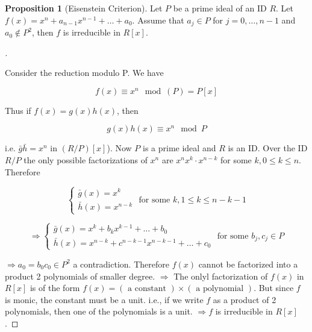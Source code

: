 \documentclass{article}
\theoremstyle{definition}
\newtheorem{prop}{Proposition}
\newenvironment{proofs}[1][\proofname]{%
  \begin{proof}[#1]$ $\par\nobreak\ignorespaces
}{%
  \end{proof}
}
\begin{document}
\begin{prop}[Eisenstein Criterion]
  Let $P$ be a prime ideal of an ID $R$. Let $f(x) = x^n + a_{n - 1}x^{n - 1} + \hdots + a_0$. Assume that $a_j \in P$ for $j = 0, \hdots, n - 1$ and $a_0 \notin P^2$, then $f$ is irreducible in $R[x]$.  
\end{prop}

\begin{proofs}
  Consider the reduction modulo P. We have

  $$f(x) \equiv x^n \mod (P)=P[x]$$

  Thus if $f(x) = g(x) h(x)$, then 

  $$g(x) h(x) \equiv x^n \mod P$$

  i.e. $\bar{g} \bar{h} = x^n$ in $(R/P)[x]$). Now $P$ is a prime ideal and $R$ is an ID. Over the ID $R/P$ the only possible factorizations of $x^n$ are $x^n  x^k \cdot x^{n - k}$ for some $k, 0 \leq k \leq n$. Therefore 

  $$
  \left\{
  \begin{array}{c}
    \bar{g}(x) = x^k \\
    \bar{h}(x) = x^{n - k}
  \end{array}
  \right.
  \text{ for some } k, 1 \leq k \leq n - k - 1
  $$

  
  $$
  \Rightarrow 
  \left\{
  \begin{array}{c}
    \bar{g}(x) = x^k + b_k x^{k - 1} + \hdots + b_0 \\
    \bar{h}(x) = x^{n - k} + c^{n - k - 1} x^{n - k - 1} + \hdots + c_0
  \end{array}
  \right.
  \text{ for some } b_j, c_j \in P
  $$

  $\Rightarrow a_0 = b_0 c_0 \in P^2$ a contradiction. Therefore $f(x)$ cannot be factorized into a product 2 polynomials of smaller degree. $\Rightarrow $ The onlyl factorization of $f(x)$ in $R[x]$ is of the form $f(x) = (\text{ a constant }) \times (\text{ a polynomial })$. But since $f$ is monic, the constant must be a unit. i.e., if we write $f$ as a product of 2 polynomials, then one of the polynomials is a unit. $\Rightarrow f$ is irreducible in $R[x]$.  
\end{proofs}
\end{document}
